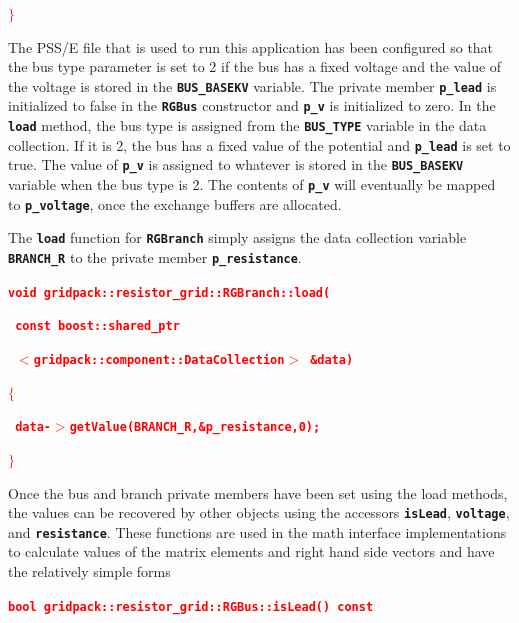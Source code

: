 \documentclass[12pt]{report} %
\begin{document}
\textcolor{red}{\texttt{\textbf{$\boldsymbol{\mathrm{\}}}$}}}

The PSS/E file that is used to run this application has been configured so that the bus type parameter is set to 2 if the bus has a fixed voltage and the value of the voltage is stored in the \texttt{\textbf{BUS\_BASEKV}} variable. The private member \texttt{\textbf{p\_lead}} is initialized to false in the \texttt{\textbf{RGBus}} constructor and \texttt{\textbf{p\_v}} is initialized to zero. In the \texttt{\textbf{load}} method, the bus type is assigned from the \texttt{\textbf{BUS\_TYPE}} variable in the data collection. If it is 2, the bus has a fixed value of the potential and \texttt{\textbf{p\_lead}} is set to true. The value of \texttt{\textbf{p\_v}} is assigned to whatever is stored in the \texttt{\textbf{BUS\_BASEKV}} variable when the bus type is 2. The contents of \texttt{\textbf{p\_v}} will eventually be mapped to \texttt{\textbf{p\_voltage}}, once the exchange buffers are allocated.

The \texttt{\textbf{load}} function for \texttt{\textbf{RGBranch}} simply assigns the data collection variable \texttt{\textbf{BRANCH\_R}} to the private member \texttt{\textbf{p\_resistance}}.

\textcolor{red}{\texttt{\textbf{void gridpack::resistor\_grid::RGBranch::load(}}}

\textcolor{red}{\texttt{\textbf{    const boost::shared\_ptr}}}

\textcolor{red}{\texttt{\textbf{    $\boldsymbol{\mathrm{<}}$gridpack::component::DataCollection$\boldsymbol{\mathrm{>}}$ \&data)}}}

\textcolor{red}{\texttt{\textbf{$\boldsymbol{\mathrm{\{}}$}}}

\textcolor{red}{\texttt{\textbf{  data-$\boldsymbol{\mathrm{>}}$getValue(BRANCH\_R,\&p\_resistance,0);}}}

\textcolor{red}{\texttt{\textbf{$\boldsymbol{\mathrm{\}}}$}}}

Once the bus and branch private members have been set using the load methods, the values can be recovered by other objects using the accessors \texttt{\textbf{isLead}}, \texttt{\textbf{voltage}}, and \texttt{\textbf{resistance}}. These functions are used in the math interface implementations to calculate values of the matrix elements and right hand side vectors and have the relatively simple forms

\textcolor{red}{\texttt{\textbf{bool gridpack::resistor\_grid::RGBus::isLead() const}}}
\end{document}

